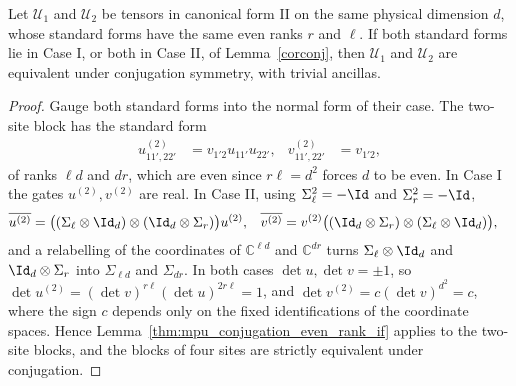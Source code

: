 \begin{lemma}
    \label{thm:mpu_conjugation_same_case_equiv_if}
    \leanok
    Let $\mathcal U_1$ and $\mathcal U_2$ be tensors in canonical form II on
    the same physical dimension $d$, whose standard forms have the same even
    ranks $r$ and $\ell$. If both standard forms lie in Case I, or both in
    Case II, of Lemma~\ref{corconj}, then $\mathcal U_1$ and $\mathcal U_2$ are
    equivalent under conjugation symmetry, with trivial ancillas.
\end{lemma}

\begin{proof}
    \leanok
    Gauge both standard forms into the normal form of their case. The
    two-site block has the standard form
    \begin{align}
        u^{(2)}_{11',22'} & =v_{1'2}u_{11'}u_{22'},
                          & v^{(2)}_{11',22'}       & =v_{1'2},
    \end{align}
    of ranks $\ell d$ and $dr$, which are even since $r\ell=d^2$ forces $d$
    to be even. In Case I the gates $u^{(2)},v^{(2)}$ are real. In Case II,
    using $\Sigma_\ell^2=-\Id$ and $\Sigma_r^2=-\Id$,
    \begin{align}
        \overline{u^{(2)}} & =\bigl((\Sigma_\ell\otimes\Id_d)\otimes
        (\Id_d\otimes\Sigma_r)\bigr)u^{(2)},
                           & \overline{v^{(2)}}                      & =v^{(2)}\bigl((\Id_d\otimes\Sigma_r)\otimes
        (\Sigma_\ell\otimes\Id_d)\bigr),
    \end{align}
    and a relabelling of the coordinates of $\mathbb C^{\ell d}$ and
    $\mathbb C^{dr}$ turns $\Sigma_\ell\otimes\Id_d$ and $\Id_d\otimes\Sigma_r$
    into $\Sigma_{\ell d}$ and $\Sigma_{dr}$. In both cases
    $\det u,\det v=\pm1$, so $\det u^{(2)}=(\det v)^{r\ell}(\det u)^{2r\ell}=1$,
    and $\det v^{(2)}=c(\det v)^{d^2}=c$, where the sign $c$ depends only on
    the fixed identifications of the coordinate spaces. Hence
    Lemma~\ref{thm:mpu_conjugation_even_rank_if} applies to the two-site
    blocks, and the blocks of four sites are strictly equivalent under
    conjugation.
\end{proof}

